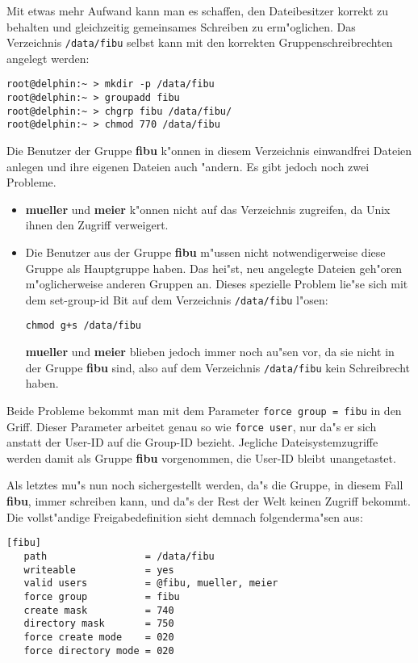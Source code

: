 \documentclass{scrartcl}\usepackage{pslatex}\typearea{12}
\newcommand{\param}{\texttt}
\newcommand{\dateistyle}{\texttt}
\newcommand{\username}{\textbf}
\begin{document}
Mit etwas mehr Aufwand kann man es schaffen, den Dateibesitzer korrekt
zu behalten und gleichzeitig gemeinsames Schreiben zu erm"oglichen.
Das Verzeichnis \dateistyle{/data/fibu} selbst kann mit den
korrekten Gruppenschreibrechten angelegt werden:

\begin{verbatim}
root@delphin:~ > mkdir -p /data/fibu
root@delphin:~ > groupadd fibu
root@delphin:~ > chgrp fibu /data/fibu/
root@delphin:~ > chmod 770 /data/fibu
\end{verbatim}

Die Benutzer der Gruppe \username{fibu} k"onnen in diesem
Verzeichnis einwandfrei Dateien anlegen und ihre eigenen Dateien auch
"andern. Es gibt jedoch noch zwei Probleme.

\begin{itemize}
\item \username{mueller} und \username{meier} k"onnen nicht auf das
  Verzeichnis zugreifen, da Unix ihnen den Zugriff verweigert.
\item Die Benutzer aus der Gruppe \username{fibu} m"ussen nicht
  notwendigerweise diese Gruppe als Hauptgruppe haben. Das hei"st, neu
  angelegte Dateien geh"oren m"oglicherweise anderen Gruppen an.
  Dieses spezielle Problem lie"se sich mit dem set-group-id Bit auf
  dem Verzeichnis \dateistyle{/data/fibu} l"osen:

\begin{verbatim}
chmod g+s /data/fibu
\end{verbatim}
  
  \username{mueller} und \username{meier} blieben jedoch immer noch
  au"sen vor, da sie nicht in der Gruppe \username{fibu} sind, also
  auf dem Verzeichnis \dateistyle{/data/fibu} kein Schreibrecht haben.
\end{itemize}

Beide Probleme bekommt man mit dem Parameter \param{force group =
  fibu} in den Griff. Dieser Parameter arbeitet genau so wie
\param{force user}, nur da"s er sich anstatt der User-ID auf die
Group-ID bezieht. Jegliche Dateisystemzugriffe werden damit als Gruppe
\username{fibu} vorgenommen, die User-ID bleibt unangetastet.

Als letztes mu"s nun noch sichergestellt werden, da"s die Gruppe, in
diesem Fall \username{fibu}, immer schreiben kann, und da"s der
Rest der Welt keinen Zugriff bekommt. Die vollst"andige
Freigabedefinition sieht demnach folgenderma"sen aus:

\begin{verbatim}
[fibu]
   path                 = /data/fibu
   writeable            = yes
   valid users          = @fibu, mueller, meier
   force group          = fibu
   create mask          = 740
   directory mask       = 750
   force create mode    = 020
   force directory mode = 020
\end{verbatim}
\end{document}
